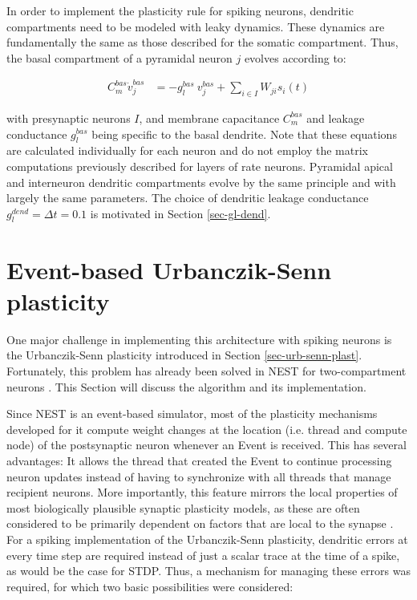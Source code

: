 In order to implement the plasticity rule for spiking neurons, dendritic compartments need to be modeled with leaky
dynamics. These dynamics are fundamentally the same as those described for the somatic compartment. Thus, the basal
compartment of a pyramidal neuron $j$ evolves according to:

\begin{align}
  C_m^{bas} \dot{v}_j^{bas} & = -g_l^{bas} \  v_j^{bas} + \sum_{i \in I} W_{ji} s_i(t)     \label{eq-spiking-basal-compartment}
\end{align}

with presynaptic neurons $I$, and membrane capacitance $C_m^{bas}$ and leakage conductance $g_l^{bas}$ being specific to
the basal dendrite. Note that these equations are calculated individually for each neuron and do not employ the matrix
computations previously described for layers of rate neurons. Pyramidal apical and interneuron dendritic compartments
evolve by the same principle and with largely the same parameters. The choice of dendritic leakage conductance
$g_l^{dend}=\Delta t=0.1$ is motivated in Section \ref{sec-gl-dend}.


\section{Event-based Urbanczik-Senn plasticity}\label{sec-event-urb}

One major challenge in implementing this architecture with spiking neurons is the Urbanczik-Senn plasticity introduced
in Section \ref{sec-urb-senn-plast}.  Fortunately, this problem has already been solved in NEST for two-compartment
neurons \citep{Stapmanns2021}. This Section will discuss the algorithm and its implementation.


Since NEST is an event-based simulator, most of the plasticity mechanisms developed for it compute weight changes at the
location (i.e. thread and compute node) of the postsynaptic neuron whenever an Event is received. This has several
advantages: It allows the thread that created the Event to continue processing neuron updates instead of having to
synchronize with all threads that manage recipient neurons.  More importantly, this feature mirrors the local properties
of most biologically plausible synaptic plasticity models, as these are often considered to be primarily dependent on
factors that are local to the synapse \citep{magee2020synaptic}. For a spiking implementation of the Urbanczik-Senn
plasticity, dendritic errors at every time step are required instead of just a scalar trace at the time of a spike, as
would be the case for STDP. Thus, a mechanism for managing these errors was required, for which two basic possibilities
were considered:

